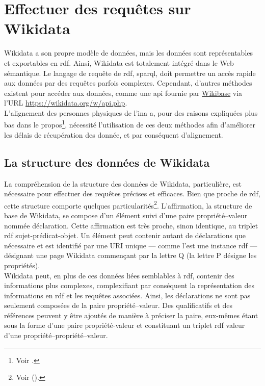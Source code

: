 \section{\label{II-C-1}Effectuer des requêtes sur Wikidata}

Wikidata a son propre modèle de données, mais les données sont représentables et exportables en \ac{rdf}. Ainsi, Wikidata est totalement intégré dans le Web sémantique. Le langage de requête de \ac{rdf}, \ac{sparql}, doit permettre un accès rapide aux données par des requêtes parfois complexes. Cependant, d'autres méthodes existent pour accéder aux données, comme une \ac{api} fournie par \href{https://www.mediawiki.org/wiki/Wikibase/API}{Wikibase} via l'URL \url{https://wikidata.org/w/api.php}.\\

L'alignement des personnes physiques de l'\ac{ina} a, pour des raisons expliquées plus bas dans le propos\footnote{Voir .}, nécessité l'utilisation de ces deux méthodes afin d'améliorer les délais de récupération des donnée, et par conséquent d'alignement.

\subsection{\label{II-C-1-a}La structure des données de Wikidata}

La compréhension de la structure des données de Wikidata, particulière, est nécessaire pour effectuer des requêtes précises et efficaces. Bien que proche de \ac{rdf}, cette structure comporte quelques particularités\footnote{Voir  ().}. L'affirmation, la structure de base de Wikidata, se compose d'un élément suivi d'une paire propriété--valeur nommée déclaration. Cette affirmation est très proche, sinon identique, au triplet \ac{rdf} sujet-prédicat-objet. Un élément peut contenir autant de déclarations que nécessaire et est identifié par une URI unique --- comme l'est une instance \ac{rdf} --- désignant une page Wikidata commençant par la lettre Q (la lettre P désigne les propriétés).\\

Wikidata peut, en plus de ces données liées semblables à \ac{rdf}, contenir des informations plus complexes, complexifiant par conséquent la représentation des informations en \ac{rdf} et les requêtes associées. Ainsi, les déclarations ne sont pas seulement composées de la paire propriété--valeur. Des qualificatifs et des références peuvent y être ajoutés de manière à préciser la paire, eux-mêmes étant sous la forme d'une paire propriété-valeur et constituant un triplet \ac{rdf} valeur d'une propriété--propriété--valeur.\\

